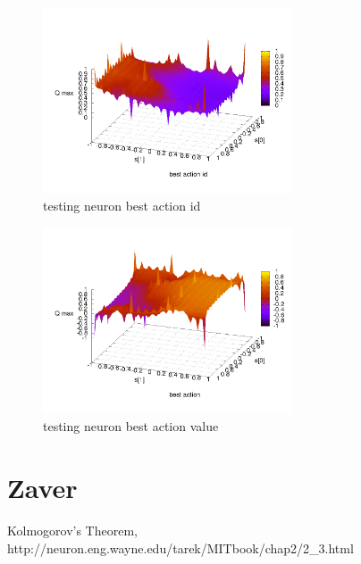 \documentclass[10pt,a5paper]{article}
\begin{document}
\begin{figure}[!ht]
\centering
\includegraphics[width=2.9in]{q_learning_test/experiment_03/testing_neuron/q_action_id.png}
\caption{testing neuron best action id}
\label{testing neuron best action id}
\end{figure}

\begin{figure}[!ht]
\centering
\includegraphics[width=2.9in]{q_learning_test/experiment_03/testing_neuron/q_action.png}
\caption{testing neuron best action value}
\label{testing neuron best action value}
\end{figure}

\clearpage










\section{Zaver}





\begin{thebibliography}{4}

 Kolmogorov's Theorem,
http://neuron.eng.wayne.edu/tarek/MITbook/chap2/2\_3.html


\end{thebibliography}
\end{document}
